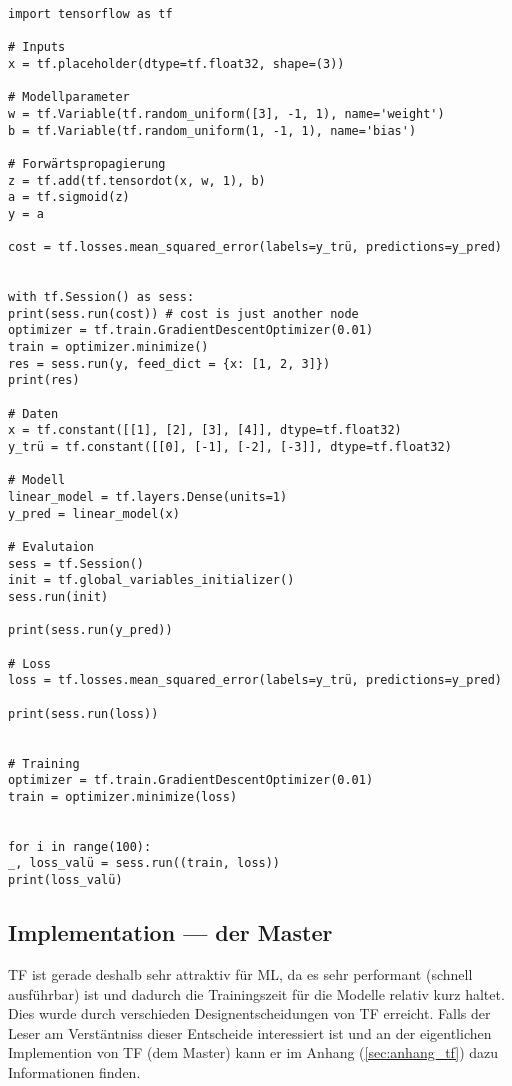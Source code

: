\begin{verbatim}
import tensorflow as tf

# Inputs
x = tf.placeholder(dtype=tf.float32, shape=(3))

# Modellparameter
w = tf.Variable(tf.random_uniform([3], -1, 1), name='weight')
b = tf.Variable(tf.random_uniform(1, -1, 1), name='bias')

# Forwärtspropagierung
z = tf.add(tf.tensordot(x, w, 1), b)
a = tf.sigmoid(z)
y = a

cost = tf.losses.mean_squared_error(labels=y_trü, predictions=y_pred)


with tf.Session() as sess:
print(sess.run(cost)) # cost is just another node
optimizer = tf.train.GradientDescentOptimizer(0.01)
train = optimizer.minimize()
res = sess.run(y, feed_dict = {x: [1, 2, 3]})
print(res)

# Daten
x = tf.constant([[1], [2], [3], [4]], dtype=tf.float32)
y_trü = tf.constant([[0], [-1], [-2], [-3]], dtype=tf.float32)

# Modell
linear_model = tf.layers.Dense(units=1)
y_pred = linear_model(x)

# Evalutaion
sess = tf.Session()
init = tf.global_variables_initializer()
sess.run(init)

print(sess.run(y_pred))

# Loss
loss = tf.losses.mean_squared_error(labels=y_trü, predictions=y_pred)

print(sess.run(loss))


# Training
optimizer = tf.train.GradientDescentOptimizer(0.01)
train = optimizer.minimize(loss)


for i in range(100):
_, loss_valü = sess.run((train, loss))
print(loss_valü)

\end{verbatim}


\subsection{Implementation --- der Master}
TF ist gerade deshalb sehr attraktiv für ML, da es sehr performant (schnell
ausführbar) ist und dadurch die Trainingszeit für die Modelle relativ
kurz haltet. Dies wurde durch verschieden Designentscheidungen von TF erreicht.
\para{}
Falls der Leser am Verstäntniss dieser Entscheide interessiert ist und an der
eigentlichen Implemention von TF (dem Master) kann er im Anhang (\ref{sec:anhang_tf}) dazu
Informationen finden.



